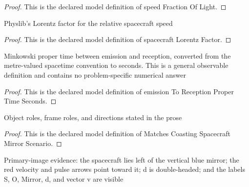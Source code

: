 \begin{proof}
  This is the declared model definition of speed Fraction Of Light.
\end{proof}
\begin{definition}
  \label{def:physics:phyx-mini-0528:phyxminiproblems-problemphyxmini0528-spacecraftlorentzfactor}
  Physlib's Lorentz factor for the relative spacecraft speed
\end{definition}
\begin{proof}
  This is the declared model definition of spacecraft Lorentz Factor.
\end{proof}
\begin{definition}
  \label{def:physics:phyx-mini-0528:phyxminiproblems-problemphyxmini0528-emissiontoreceptionpropertimeseconds}
  Minkowski proper time between emission and reception, converted from the metre-valued spacetime convention to seconds. This is a general observable definition and contains no problem-specific numerical answer
\end{definition}
\begin{proof}
  This is the declared model definition of emission To Reception Proper Time Seconds.
\end{proof}
\begin{definition}
  \label{def:physics:phyx-mini-0528:phyxminiproblems-problemphyxmini0528-matchescoastingspacecraftmirrorscenario}
  Object roles, frame roles, and directions stated in the prose
\end{definition}
\begin{proof}
  This is the declared model definition of Matches Coasting Spacecraft Mirror Scenario.
\end{proof}
\begin{definition}
  \label{def:physics:phyx-mini-0528:phyxminiproblems-problemphyxmini0528-matchessuppliedspacecraftmirrorfigure}
  Primary-image evidence: the spacecraft lies left of the vertical blue mirror; the red velocity and pulse arrows point toward it; d is double-headed; and the labels S, O, Mirror, d, and vector v are visible
\end{definition}
